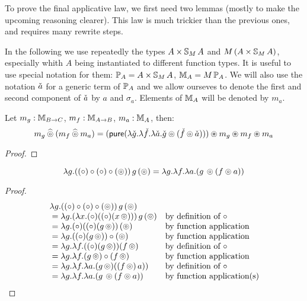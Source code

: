 
To prove the final applicative law, we first need two lemmas (mostly to make the upcoming reasoning clearer). This law is much trickier than the previous ones, and requires many rewrite steps.

In the following we use repeatedly the types $A\times \mathbb{S}_{M}\,A$ and $M\,(A\times \mathbb{S}_{M}\,A)$, especially whith $A$ being instantiated to different function types.
It is useful to use special notation for them:
$\mathbb{P}_{A} = A\times \mathbb{S}_{M}\,A$, $\mathbb{M}_{A} = M\,\mathbb{P}_{A}$.
We will also use the notation $\check{a}$ for a generic term of $\mathbb{P}_{A}$
and we allow ourseves to denote the first and second component of $\check{a}$ by $a$ and $\sigma_a$.
Elements of $\mathbb{M}_{A}$ will be denoted by $m_a$.

\begin{lemma}\label{lemma:pappl_comp_appl}
Let $m_g:\mathbb{M}_{B\rightarrow C}$, $m_f:\mathbb{M}_{A\rightarrow B}$, $m_a:\mathbb{M}_{A}$, then:
$$
m_g \mathbin{\widehat{\circledcirc}} (m_f \mathbin{\widehat{\circledcirc}} m_a)
 = (\mathsf{pure} (\lambda \check{g}. \lambda \check{f}. \lambda \check{a}. \check{g} \circledcirc (\check{f}\circledcirc \check{a}))) \circledast m_g \circledast m_f \circledast m_a
$$
\end{lemma}
\begin{proof}
\end{proof}



\begin{lemma}\label{lemma:appl_comp_law}
$$
\lambda g . ((\circ) \circ (\circ) \circ (\circledcirc))\, g\, (\circledcirc) = \lambda g . \lambda f . \lambda a . (g\, \circledcirc (f \circledcirc a))
$$
\end{lemma}
\begin{proof}
$$
\begin{array}{ll}
\lambda g . ((\circ) \circ (\circ) \circ (\circledcirc))\, g\, (\circledcirc) \\
{}= \lambda g . (\lambda x . (\circ) ((\circ) (x\, \circledcirc)))\, g\, (\circledcirc)
 &\mbox{by definition of }\circ\\
{}= \lambda g . (\circ) ((\circ) (g\, \circledcirc))\, (\circledcirc) 
& \mbox{by function application}\\
{}= \lambda g . ((\circ) (g\, \circledcirc)) \circ (\circledcirc) 
& \mbox{by function application}\\
{}= \lambda g . \lambda f . ((\circ) (g\, \circledcirc)) (f\, \circledcirc) 
 &\mbox{by definition of }\circ\\
{}= \lambda g . \lambda f . (g\, \circledcirc) \circ (f\, \circledcirc)
& \mbox{by function application}\\
{}= \lambda g . \lambda f . \lambda a . (g\, \circledcirc) ((f\, \circledcirc)\, a) ) 
& \mbox{by definition of }\circ\\
{}= \lambda g . \lambda f . \lambda a . (g\, \circledcirc (f \circledcirc a))
& \mbox{by function application(s)}\\
\end{array}
$$
\end{proof}

